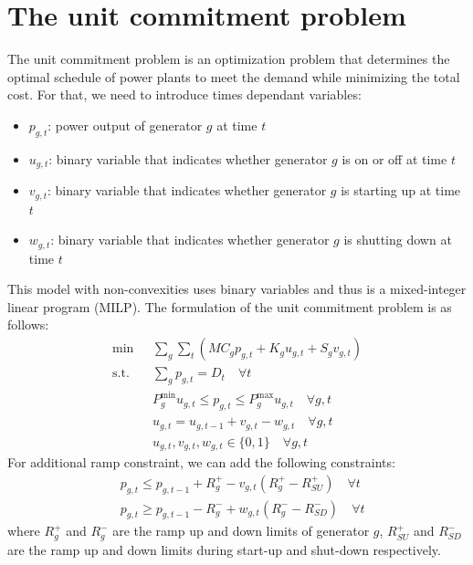 \documentclass[12pt, openany]{report}
\theoremstyle{definition}
\begin{document}
\section{The unit commitment problem}
The unit commitment problem is an optimization problem that determines the optimal schedule of power plants to meet the demand while minimizing the total cost. For that, we need to introduce times dependant variables:
\begin{itemize}
    \item $p_{g,t}$: power output of generator $g$ at time $t$
    \item $u_{g,t}$: binary variable that indicates whether generator $g$ is on or off at time $t$
    \item $v_{g,t}$: binary variable that indicates whether generator $g$ is starting up at time $t$
    \item $w_{g,t}$: binary variable that indicates whether generator $g$ is shutting down at time $t$
\end{itemize}
This model with non-convexities uses binary variables and thus is a mixed-integer linear program (MILP). The formulation of the unit commitment problem is as follows:
\begin{equation}
    \begin{aligned}
        \min & \sum_{g} \sum_{t} (MC_g p_{g,t} + K_g u_{g,t} + S_g v_{g,t}) \\
        \text{s.t.} \quad & \sum_{g} p_{g,t} = D_t \quad \forall t \\
        & P_g^{\min} u_{g,t} \leq p_{g,t} \leq P_g^{\max} u_{g,t} \quad \forall g,t \\
        & u_{g,t} = u_{g,t-1} + v_{g,t} - w_{g,t} \quad \forall g,t \\
        & u_{g,t}, v_{g,t}, w_{g,t} \in \{0,1\} \quad \forall g,t
    \end{aligned}
\end{equation}
For additional ramp constraint, we can add the following constraints:
\begin{equation}
    \begin{aligned}
        & p_{g,t} \leq p_{g,t-1} + R_g^{+} - v_{g,t} (R_g^{+} - R_{SU}^+) \quad \forall t \\
        & p_{g,t} \geq p_{g,t-1} - R_g^{-} + w_{g,t} (R_g^{-} - R_{SD}^-) \quad \forall t
    \end{aligned}
\end{equation}
where $R_g^{+}$ and $R_g^{-}$ are the ramp up and down limits of generator $g$, $R_{SU}^+$ and $R_{SD}^-$ are the ramp up and down limits during start-up and shut-down respectively.\\
\end{document}
